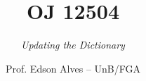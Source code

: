 \title{OJ 12504}
\subtitle{\textit{Updating the Dictionary}}
\author{Prof. Edson Alves -- UnB/FGA}
\date{}
